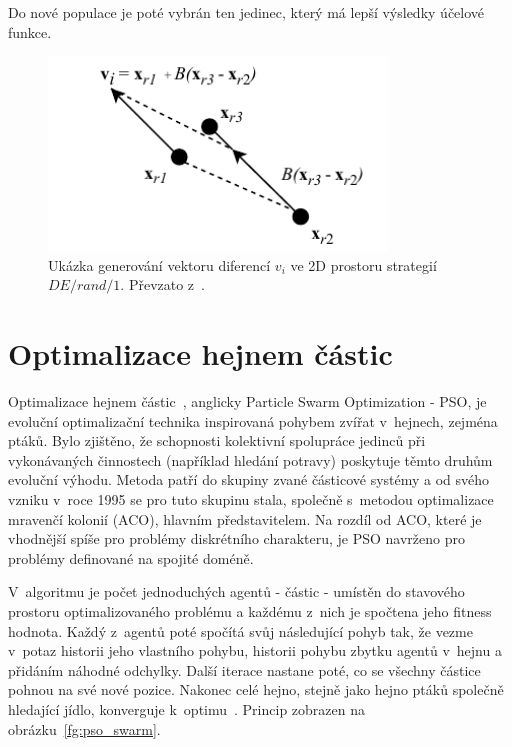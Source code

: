 Do nové populace je poté vybrán ten jedinec, který má lepší výsledky účelové funkce.

\begin{figure}[hbt]
	\centering
	\includegraphics[width=0.8\textwidth]{obrazky-figures/de.pdf}
	\caption{Ukázka generování vektoru diferencí $v_i$ ve 2D prostoru strategií $DE/rand/1$. Převzato z~\cite{EVO}.}
	\label{fg:de}
\end{figure}

\section{Optimalizace hejnem částic}
\label{algs:pso}
Optimalizace hejnem částic~\cite{EVO}, anglicky Particle Swarm Optimization - PSO, je evoluční optimalizační technika inspirovaná pohybem zvířat v~hejnech, zejména ptáků. Bylo zjištěno, že schopnosti kolektivní spolupráce jedinců při vykonávaných činnostech (například hledání potravy) poskytuje těmto druhům evoluční výhodu. Metoda patří do skupiny zvané částicové systémy a od svého vzniku v~roce 1995 se pro tuto skupinu stala, společně s~metodou optimalizace mravenčí kolonií (ACO), hlavním představitelem. Na rozdíl od ACO, které je vhodnější spíše pro problémy diskrétního charakteru, je PSO navrženo pro problémy definované na spojité doméně. 

V~algoritmu je počet jednoduchých agentů - částic - umístěn do stavového prostoru optimalizovaného problému a každému z~nich je spočtena jeho fitness hodnota. Každý z~agentů poté spočítá svůj následující pohyb tak, že vezme v~potaz historii jeho vlastního pohybu, historii pohybu zbytku agentů v~hejnu a přidáním náhodné odchylky. Další iterace nastane poté, co se všechny částice pohnou na své nové pozice. Nakonec celé hejno, stejně jako hejno ptáků společně hledající jídlo, konverguje k~optimu~\cite{pso_article}. Princip zobrazen na obrázku~\ref{fg:pso_swarm}. 

